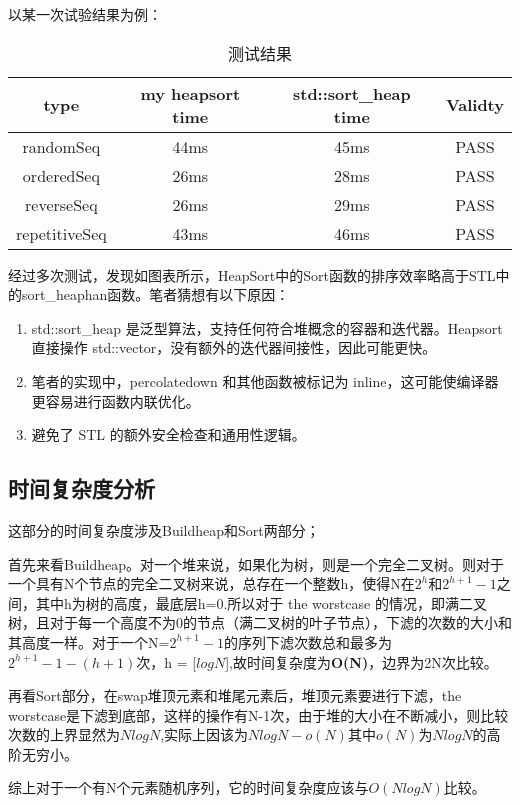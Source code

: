 \documentclass[fontset=fandol]{ctexart}
\begin{document}
以某一次试验结果为例：
\begin{table}[H]
\centering
\begin{tabular}{|c|c|c|c|}
\hline
\textbf{type}   & \textbf{my heapsort time} & \textbf{std::sort\_heap time} &\textbf{Validty}\\ \hline
randomSeq       &44ms                       &45ms    &PASS\\ \hline
orderedSeq      &26ms                       &28ms    &PASS\\ \hline
reverseSeq      &26ms                       &29ms    &PASS\\ \hline
repetitiveSeq   &43ms                       &46ms    &PASS\\ \hline
\end{tabular}
\caption{测试结果}
\label{tab:simple_table}
\end{table}

经过多次测试，发现如图表所示，HeapSort中的Sort函数的排序效率略高于STL中的sort\_heaphan函数。笔者猜想有以下原因：
\begin{enumerate}
    \item std::sort\_heap 是泛型算法，支持任何符合堆概念的容器和迭代器。Heapsort 直接操作 std::vector，没有额外的迭代器间接性，因此可能更快。
    \item 笔者的实现中，percolatedown 和其他函数被标记为 inline，这可能使编译器更容易进行函数内联优化。
    \item 避免了 STL 的额外安全检查和通用性逻辑。
\end{enumerate}

\subsection{时间复杂度分析}
这部分的时间复杂度涉及Buildheap和Sort两部分；

首先来看Buildheap。对一个堆来说，如果化为树，则是一个完全二叉树。则对于一个具有N个节点的完全二叉树来说，总存在一个整数h，使得N在$2^h$和$2^{h+1}-1$之间，其中h为树的高度，最底层h=0.所以对于 the worstcase 的情况，即满二叉树，且对于每一个高度不为0的节点（满二叉树的叶子节点），下滤的次数的大小和其高度一样。对于一个N=$2^{h+1}-1$的序列下滤次数总和最多为$2^{h+1}-1-(h+1)$次，h = [$logN$],故时间复杂度为\textbf{O(N)}，边界为2N次比较。

再看Sort部分，在swap堆顶元素和堆尾元素后，堆顶元素要进行下滤，the worstcase是下滤到底部，这样的操作有N-1次，由于堆的大小在不断减小，则比较次数的上界显然为$NlogN$,实际上因该为$NlogN-o(N)$其中$o(N)$为$NlogN$的高阶无穷小。

综上对于一个有N个元素随机序列，它的时间复杂度应该与$O(NlogN)$比较。
\end{document}
